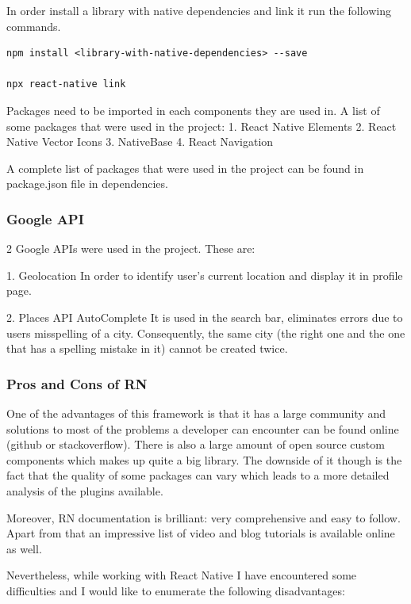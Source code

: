 In order install a library with native dependencies and link it run the following commands.

\begin{lstlisting}
npm install <library-with-native-dependencies> --save

npx react-native link
\end{lstlisting}

Packages need to be imported in each components they are used in.
A list of some packages that were used in the project:
 1. React Native Elements 
 2. React Native Vector Icons
 3. NativeBase
 4. React Navigation
 
 A complete list of packages that were used in the project can be found in package.json file in dependencies.
 
 \subsubsection{Google API}
 2 Google APIs were used in the project. These are:
 
   1. Geolocation
   In order to identify user's current location and display it in profile page.
   
   2. Places API AutoComplete
   It is used in the search bar, eliminates  errors due to users misspelling of a city.
   Consequently, the same city (the right one and the one that has a spelling mistake in it) cannot be created twice.

 
 \subsubsection{Pros and Cons of RN}
 
One of the advantages of this framework is that it has a large community and solutions to most of the problems a developer can encounter can be found online (github or stackoverflow).
There is also a large amount of open source custom components which makes up quite a big library. The downside of it though is the fact that the quality of some packages can vary which leads to a more detailed analysis of the plugins available.

Moreover, RN documentation is brilliant: very comprehensive and easy to follow.
Apart from that an impressive list of video and blog tutorials is available online as well.

Nevertheless, while working with React Native I have encountered some difficulties and I would like to enumerate the following disadvantages:


